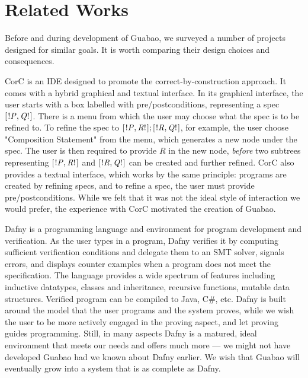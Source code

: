 \documentclass[runningheads]{llncs}
\newcommand{\Conid}[1]{\mathit{#1}}
\let\Conid\mathit
\begin{document}
\section{Related Works}
\label{sec:related-works}

Before and during development of Guabao, we surveyed a number of projects designed for similar goals.
It is worth comparing their design choices and consequences.

CorC \cite{Schaefer:18:CorC,Runge:19:Tool} is an IDE designed to promote the correct-by-construction approach.
It comes with a hybrid graphical and textual interface.
In its graphical interface, the user starts with a box labelled with pre/postconditions, representing a spec \ensuremath{[\mskip1.5mu \mathbin{!}\Conid{P},\Conid{Q}\mathbin{!}\mskip1.5mu]}.
There is a menu from which the user may choose what the spec is to be refined to.
To refine the spec to \ensuremath{[\mskip1.5mu \mathbin{!}\Conid{P},\Conid{R}\mathbin{!}\mskip1.5mu];[\mskip1.5mu \mathbin{!}\Conid{R},\Conid{Q}\mathbin{!}\mskip1.5mu]}, for example, the user choose "Composition Statement" from the menu, which generates a new node under the spec.
The user is then required to provide \ensuremath{\Conid{R}} in the new node, \emph{before} two subtrees representing \ensuremath{[\mskip1.5mu \mathbin{!}\Conid{P},\Conid{R}\mathbin{!}\mskip1.5mu]} and \ensuremath{[\mskip1.5mu \mathbin{!}\Conid{R},\Conid{Q}\mathbin{!}\mskip1.5mu]} can be created and further refined.
CorC also provides a textual interface, which works by the same principle:
programs are created by refining specs,
and to refine a spec, the user must provide pre/postconditions.
While we felt that it was not the ideal style of interaction we would prefer,
the experience with CorC motivated the creation of Guabao.

Dafny \cite{Leino:14:Dafny} is a programming language and environment for program development and verification.
As the user types in a program, Dafny verifies it by computing sufficient verification conditions and delegate them to an SMT solver, signals errors, and displays counter examples when a program does not meet the specification.
The language provides a wide spectrum of features including
inductive datatypes, classes and inheritance, recursive functions, mutable data structures.
Verified program can be compiled to Java, C#, etc.
Dafny is built around the model that the user programs and the system proves,
while we wish the user to be more actively engaged in the proving aspect, and let proving guides programming.
Still, in many aspects Dafny is a matured, ideal environment that meets our needs and offers much more --- we might not have developed Guabao had we known about Dafny earlier.
We wish that Guabao will eventually grow into a system that is as complete as Dafny.
\end{document}
